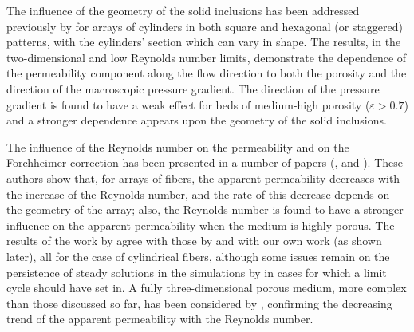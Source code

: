 The influence of the geometry of the solid inclusions has been addressed previously by \citet{yazdchi2011} for arrays of cylinders 
in both square and hexagonal (or staggered) patterns, with the cylinders' section which can vary in shape. The results, in the 
two-dimensional and low Reynolds number limits, demonstrate the dependence of the  permeability component along the flow direction to both 
the porosity and the direction of the macroscopic pressure gradient. The direction of the pressure gradient is found to have a weak effect 
for beds of medium-high porosity ($\varepsilon>0.7$) and a stronger dependence appears upon the geometry of the solid inclusions. 

The influence of the Reynolds number on the permeability and on the Forchheimer correction has been presented in a number of papers (\citet{firdaouss1997nonlinear}, \citet{penha2011computing} and \citet{edwards1990}). These authors show that, for arrays of fibers, the apparent permeability decreases with the increase of the Reynolds number, and the rate of this decrease depends on the geometry of the array;
also, the Reynolds number is found to have a stronger influence on the apparent permeability when the medium is highly porous.
The results of the work by \citet{edwards1990} agree with those by \citet{zampogna} and with our own work (as shown later), all for
the case of cylindrical fibers, although some issues remain on the persistence of steady solutions in the simulations by \citet{edwards1990} 
in cases for which a limit cycle should have set in. A fully three-dimensional porous medium, more complex than those discussed so far, 
has been considered by \citet{soulaine2014}, confirming the decreasing trend of the apparent permeability with the Reynolds number. 

